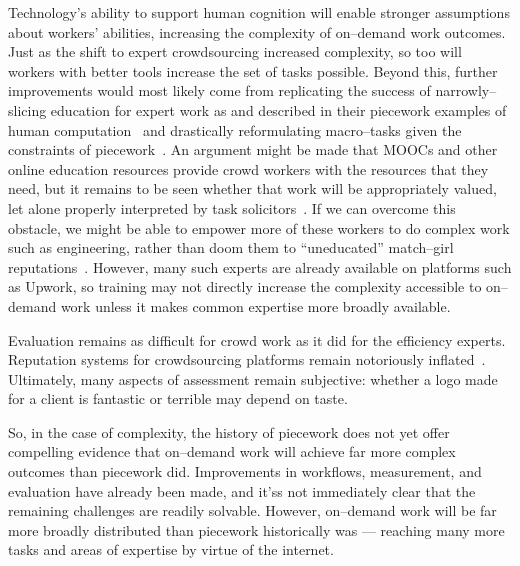 \documentclass[trackingWork]{subfiles}
\begin{document}
Technology's ability to support human cognition will enable stronger assumptions about workers' abilities, increasing the complexity of on--demand work outcomes.
Just as the shift to expert crowdsourcing increased complexity, so too will workers with better tools increase the set of tasks possible.
Beyond this, further improvements would most likely come from replicating the success of narrowly--slicing education for expert work as \citeauthor{hart2013rise} and \citeauthor{grier2013computers} described in their piecework examples
of human computation~\cite{grier2013computers} and
drastically reformulating macro--tasks given the constraints of piecework~\cite{hart2013rise}.
An argument might be made that
MOOCs and other online education resources
provide crowd workers with the resources that they need, but 
it remains to be seen whether that work will be appropriately valued, let alone
properly interpreted by task solicitors~\cite{aguaded2013mooc}.
If we can overcome this obstacle,
we might be able to empower more of these workers to do complex work such as engineering,
rather than doom them to ``uneducated'' match--girl reputations~\cite{10.2307/3827491}.
However, many such experts are already available on platforms such as Upwork, so training may not directly increase the complexity accessible to on--demand work unless it makes common expertise more broadly available.

Evaluation remains as difficult for crowd work as it did for the efficiency experts. 
Reputation systems for crowdsourcing platforms remain notoriously inflated~\cite{Horton2015a}.
Ultimately, many aspects of assessment remain subjective: whether a logo made for a client is fantastic or terrible may depend on taste.

So, in the case of complexity, the history of piecework does not yet offer compelling evidence that on--demand work will achieve far more complex outcomes than piecework did.
Improvements in workflows, measurement, and evaluation have already been made, and it'ss not immediately clear that the remaining challenges are readily solvable.
However, on--demand work will be far more broadly distributed than piecework historically was
--- reaching many more tasks and areas of expertise by virtue of the internet.
\end{document}
